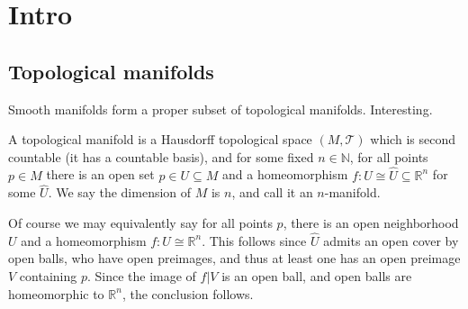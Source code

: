 \chapter{Intro}
\section{Topological manifolds}
Smooth manifolds form a proper subset of topological manifolds. Interesting.

\begin{definition}\label{1.1.1}
	A topological manifold is a Hausdorff topological space $(M,\mathcal{T} )$ which is second countable (it has a countable basis), and for some fixed $n\in\mathbb{N} $, for all points $p\in M$ there is an open set $p\in U\subseteq M$ and a homeomorphism $f : U \cong \hat{U} \subseteq \mathbb{R} ^n$ for some $\hat{U} $. We say the dimension of $M$ is $n$, and call it an $n$-manifold.
\end{definition}

Of course we may equivalently say for all points $p$, there is an open neighborhood $U$ and a homeomorphism $f : U \cong \mathbb{R} ^n$. This follows since $\hat{U} $ admits an open cover by open balls, who have open preimages, and thus at least one has an open preimage $V$ containing $p$. Since the image of $f|V$ is an open ball, and open balls are homeomorphic to $\mathbb{R} ^n$, the conclusion follows.
